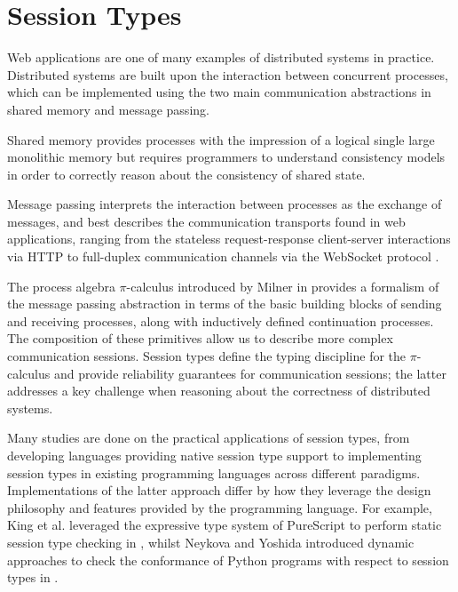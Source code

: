 \section{Session Types}

Web applications are one of many examples of distributed systems in practice. Distributed systems are built upon the interaction between concurrent processes, which can be implemented using the two main communication abstractions in {shared memory} and {message passing}. 

Shared memory provides processes with the impression of a logical single large monolithic memory but requires programmers to understand consistency models in order to correctly reason about the consistency of shared state.

Message passing interprets the interaction between processes as the exchange of messages, and best describes the communication transports found in web applications, ranging from the stateless request-response client-server interactions via HTTP to full-duplex communication channels via the WebSocket protocol \cite{WebSocketRFC}.

The process algebra $\pi$-calculus introduced by Milner in \cite{Milner1999} provides a formalism of the message passing abstraction in terms of the basic building blocks of sending and receiving processes, along with inductively defined continuation processes. The composition of these primitives allow us to describe more complex communication sessions.
Session types define the typing discipline for the $\pi$-calculus and provide reliability guarantees for communication sessions; the latter addresses a key challenge when reasoning about the correctness of distributed systems. 

Many studies are done on the practical applications of session types, from developing languages providing native session type support \cite{ATS2016} to implementing session types in existing programming languages across different paradigms.
Implementations of the latter approach differ by how they leverage the design philosophy and features provided by the programming language. For example, King et al. leveraged the expressive type system of PureScript to perform static session type checking in \cite{PureScript2019}, whilst Neykova and Yoshida introduced dynamic approaches to check the conformance of Python programs with respect to session types in \cite{Python2017}.

